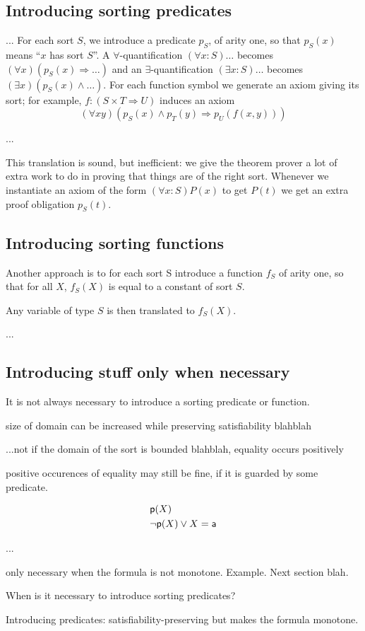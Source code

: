 \subsection{Introducing sorting predicates}

... For each sort $S$, we introduce a predicate $p_S$, of arity one,
so that $p_S(x)$ means ``$x$ has sort $S$''. A
$\forall$-quantification $(\forall x:S)\ldots$ becomes $(\forall
x)(p_S(x) \Rightarrow \ldots)$ and an $\exists$-quantification
$(\exists x:S)\ldots$ becomes $(\exists x)(p_S(x) \land \ldots)$. For
each function symbol we generate an axiom giving its sort; for
example, $f : (S \times T \Rightarrow U)$ induces an axiom
\begin{displaymath}
(\forall x y)(p_S(x) \land p_T(y) \Rightarrow p_U(f(x, y)))
\end{displaymath}

...

This translation is sound, but inefficient: we give the theorem prover
a lot of extra work to do in proving that things are of the right
sort. Whenever we instantiate an axiom of the form $(\forall
x:S)P(x)$ to get $P(t)$ we get an extra proof obligation $p_S(t)$.

\subsection{Introducing sorting functions}

Another approach is to for each sort S introduce a function $f_S$ of
arity one, so that for all $X$, $f_S(X)$ is equal to a constant of sort $S$. 

Any variable of type $S$ is then translated to $f_S(X)$.

...

\subsection{Introducing stuff only when necessary}

It is not always necessary to introduce a sorting predicate or function.

size of domain can be increased while preserving satisfiability blahblah

...not if the domain of the sort is bounded blahblah, equality occurs positively

positive occurences of equality may still be fine, if it is guarded by some predicate.


\begin{example}
\label{ex:extension_conflict}
\begin{eqnarray}
 & \mbox{\sf p}(X) \\
 & \neg \mbox{\sf p}(X) \lor X = \mbox{\sf a} 
\end{eqnarray}
\end{example}



...

only necessary when the formula is not monotone. Example.
Next section blah.

When is it necessary to introduce sorting predicates?

Introducing predicates: satisfiability-preserving but makes the
formula monotone.
